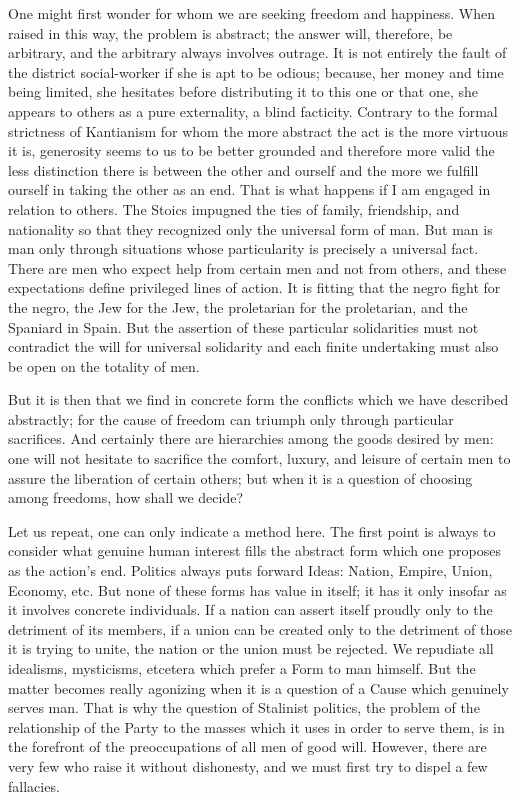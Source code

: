 \documentclass[11pt]{article}
\begin{document}
{{One might first wonder for whom we are seeking freedom and happiness. When raised in this way, the problem is abstract; the answer will, therefore, be arbitrary, and the arbitrary always involves outrage. It is not entirely the fault of the district social-worker if she is apt to be odious; because, her money and time being limited, she hesitates before distributing it to this one or that one, she appears to others as a pure externality, a blind facticity. Contrary to the formal strictness of Kantianism for whom the more abstract the act is the more virtuous it is, generosity seems to us to be better grounded and therefore more valid the less distinction there is between the other and ourself and the more we fulfill ourself in taking the other as an end. That is what happens if I am engaged in relation to others. The Stoics impugned the ties of family, friendship, and nationality so that they recognized only the universal form of man. But man is man only through situations whose particularity is precisely a universal fact. There are men who expect help from certain men and not from others, and these expectations define privileged lines of action. It is fitting that the negro fight for the negro, the Jew for the Jew, the proletarian for the proletarian, and the Spaniard in Spain. But the assertion of these particular solidarities must not contradict the will for universal solidarity and each finite undertaking must also be open on the totality of men.

But it is then that we find in concrete form the conflicts which we have described abstractly; for the cause of freedom can triumph only through particular sacrifices. And certainly there are hierarchies among the goods desired by men: one will not hesitate to sacrifice the comfort, luxury, and leisure of certain men to assure the liberation of certain others; but when it is a question of choosing among freedoms, how shall we decide?

Let us repeat, one can only indicate a method here. The first point is always to consider what genuine human interest fills the abstract form which one proposes as the action’s end. Politics always puts forward Ideas: Nation, Empire, Union, Economy, etc. But none of these forms has value in itself; it has it only insofar as it involves concrete individuals. If a nation can assert itself proudly only to the detriment of its members, if a union can be created only to the detriment of those it is trying to unite, the nation or the union must be rejected. We repudiate all idealisms, mysticisms, etcetera which prefer a Form to man himself. But the matter becomes really agonizing when it is a question of a Cause which genuinely serves man. That is why the question of Stalinist politics, the problem of the relationship of the Party to the masses which it uses in order to serve them, is in the forefront of the preoccupations of all men of good will. However, there are very few who raise it without dishonesty, and we must first try to dispel a few fallacies.

}}
\end{document}
